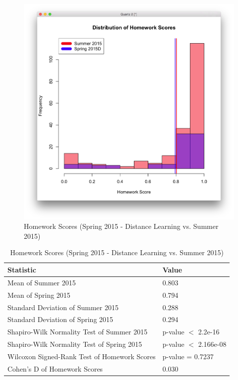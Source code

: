 \begin{figure}
	\centering
	\includegraphics[width=6in]{img/chapter4/hw_su15_vs_sp15d}
	\caption[Homework Scores (Spring 2015 - Distance Learning vs. Summer 2015)]{Homework Scores (Spring 2015 - Distance Learning vs. Summer 2015)}
  \label{fig:hwSu14Su15}
\end{figure}

\begin{small}
\begin{table}
  \centering
  \begin{tabular}{|l|l|}
    \hline
    \textbf{Statistic} & \textbf{Value} \\
	\hline
	Mean of Summer 2015 & 0.803 \\
	\hline
	Mean of Spring 2015 & 0.794 \\
	\hline
	Standard Deviation of Summer 2015 & 0.288 \\
	\hline
	Standard Deviation of Spring 2015 & 0.294 \\
	\hline
	Shapiro-Wilk Normality Test of Summer 2015 & p-value $<$ 2.2e-16 \\
	\hline
	Shapiro-Wilk Normality Test of Spring 2015 & p-value $<$ 2.166e-08 \\
	\hline
	Wilcoxon Signed-Rank Test of Homework Scores & p-value = 0.7237 \\
	\hline
	Cohen's D of Homework Scores & 0.030 \\
	\hline
  \end{tabular}
	\caption[Homework Scores (Spring 2015 - Distance Learning vs. Summer 2015)]{Homework Scores (Spring 2015 - Distance Learning vs. Summer 2015)}
  \label{fig:hwSu14Su15}
\end{table}
\end{small}


